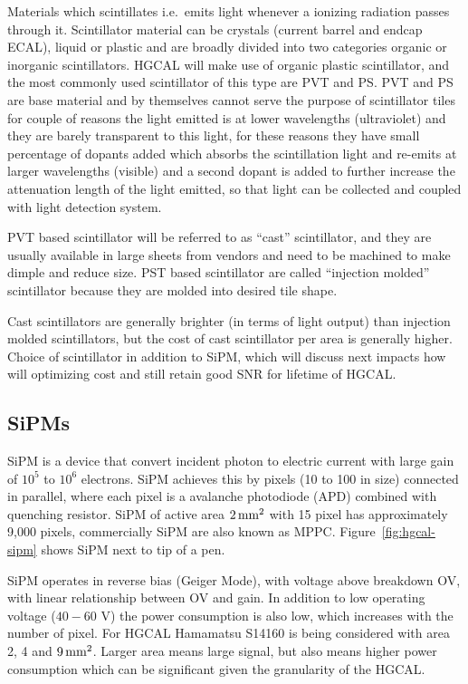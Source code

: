 Materials which scintillates i.e.~emits light
whenever a ionizing radiation passes through it.
Scintillator material can be crystals (current barrel and endcap
\gls{ECAL}), liquid or plastic and are broadly divided into two
categories organic or inorganic scintillators.
\gls{HGCAL} will make use of organic plastic scintillator, and the most
commonly used scintillator of this type are \gls{PVT} and \gls{PS}.
\gls{PVT} and \gls{PS} are base material and
by themselves cannot serve the purpose of scintillator tiles for couple of
reasons the light emitted is at lower wavelengths (ultraviolet)
and they are barely transparent to this light,
for these reasons they have small percentage of dopants added
which absorbs the scintillation light and re-emits at larger wavelengths (visible)
and a second dopant is added to further increase the attenuation length of
the light emitted, so that light can be collected and coupled with light
detection system.

\gls{PVT} based scintillator will be referred to as ``cast'' scintillator,
and they are usually available in large sheets from vendors and
need to be machined to make dimple and reduce size.
\gls{PST} based scintillator are called ``injection molded'' scintillator
because they are molded into desired tile shape.

Cast scintillators are generally brighter (in terms of light output)
than injection molded scintillators, but the cost of
cast scintillator per area is generally higher.
Choice of scintillator in addition to \gls{SiPM}, which will discuss next
impacts how will optimizing
cost and still retain good \gls{SNR} for lifetime of \gls{HGCAL}.

\subsection{
  SiPMs
}

\gls{SiPM} is a device that convert incident photon to electric
current with large gain of \( 10^5 \) to \( 10^6 \) electrons.
\gls{SiPM} achieves this by pixels (10\micron{} to 100\micron{} in size)
connected in parallel, where each pixel is a avalanche photodiode (APD)
combined with quenching resistor. \gls{SiPM} of active
area \( 2\,\text{mm}{}^2 \) with 15\micron{} pixel has approximately 9,000 pixels,
commercially \gls{SiPM} are also known as \gls{MPPC}. Figure~\ref{fig:hgcal-sipm}
shows \gls{SiPM} next to tip of a pen.

\gls{SiPM} operates in reverse bias (Geiger Mode),
with voltage above breakdown \gls{OV}, with linear relationship
between \gls{OV} and gain.
In addition to low operating voltage (\(40-60\) V) the power
consumption is also low, which increases with the number of pixel.
For \gls{HGCAL} Hamamatsu S14160 is being considered with
area 2, 4 and \(9\,\text{mm}{}^2\). Larger area means large signal, but
also means higher power consumption which can be significant given
the granularity of the \gls{HGCAL}.

